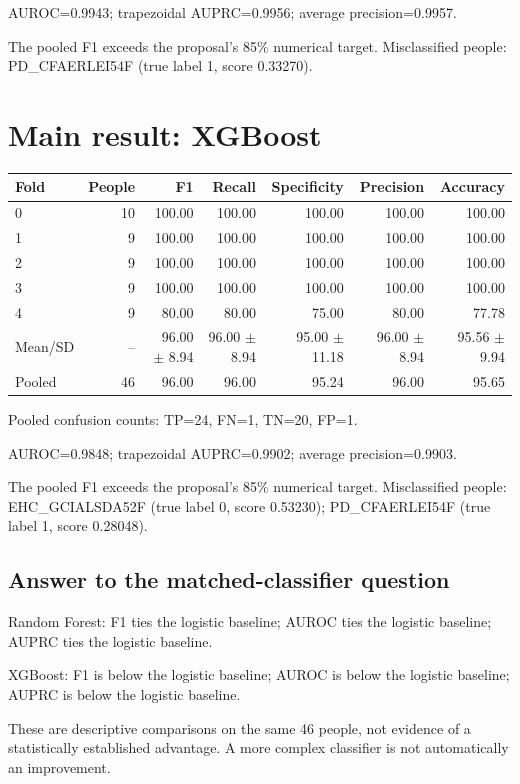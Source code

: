 \documentclass[11pt,a4paper]{article}
\begin{document}
AUROC=0.9943; trapezoidal AUPRC=0.9956; average precision=0.9957.

The pooled F1 exceeds the proposal's 85\% numerical target. 
Misclassified people: PD\_CFAERLEI54F (true label 1, score 0.33270).

\clearpage\section{Main result: XGBoost}
\begin{center}\small\begin{tabular}{lrrrrrr}\toprule Fold & People & F1 & Recall & Specificity & Precision & Accuracy\\\midrule
0 & 10 & 100.00 & 100.00 & 100.00 & 100.00 & 100.00\\
1 & 9 & 100.00 & 100.00 & 100.00 & 100.00 & 100.00\\
2 & 9 & 100.00 & 100.00 & 100.00 & 100.00 & 100.00\\
3 & 9 & 100.00 & 100.00 & 100.00 & 100.00 & 100.00\\
4 & 9 & 80.00 & 80.00 & 75.00 & 80.00 & 77.78\\
Mean/SD & -- & 96.00 $\pm$ 8.94 & 96.00 $\pm$ 8.94 & 95.00 $\pm$ 11.18 & 96.00 $\pm$ 8.94 & 95.56 $\pm$ 9.94\\\midrule
Pooled & 46 & 96.00 & 96.00 & 95.24 & 96.00 & 95.65\\\bottomrule\end{tabular}\end{center}
Pooled confusion counts: TP=24, FN=1, TN=20, FP=1.

AUROC=0.9848; trapezoidal AUPRC=0.9902; average precision=0.9903.

The pooled F1 exceeds the proposal's 85\% numerical target. 
Misclassified people: EHC\_GCIALSDA52F (true label 0, score 0.53230); PD\_CFAERLEI54F (true label 1, score 0.28048).

\subsection*{Answer to the matched-classifier question}
Random Forest: F1 ties the logistic baseline; AUROC ties the logistic baseline; AUPRC ties the logistic baseline.

XGBoost: F1 is below the logistic baseline; AUROC is below the logistic baseline; AUPRC is below the logistic baseline.

These are descriptive comparisons on the same 46 people, not evidence of a statistically established advantage. A more complex classifier is not automatically an improvement.
\end{document}
